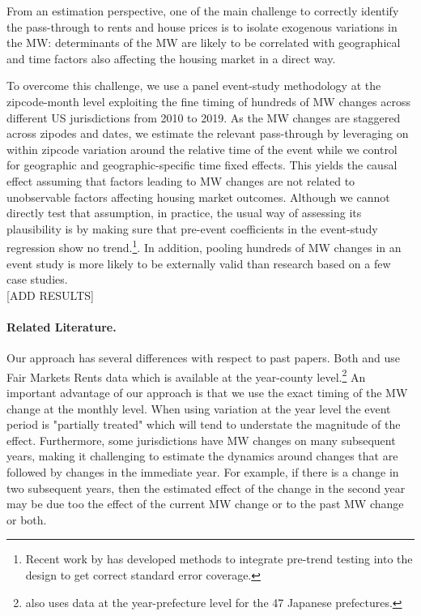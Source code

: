 From an estimation perspective, one of the main challenge to correctly identify the pass-through to rents and house prices is to isolate exogenous variations in the MW: determinants of the MW are likely to be correlated with geographical and time factors also affecting the housing market in a direct way. 
 
To overcome this challenge, we use a panel event-study methodology \parencite{abraham2018estimating, borusyak2017revisiting} at the zipcode-month level exploiting the fine timing of hundreds of MW changes across different US jurisdictions from 2010 to 2019. As the MW changes are staggered across zipodes and dates, we estimate the relevant pass-through by leveraging on within zipcode variation around the relative time of the event while we control for geographic and geographic-specific time fixed effects. This yields the causal effect assuming that factors leading to MW changes are not related to unobservable factors affecting housing market outcomes. Although we cannot directly test that assumption, in practice, the usual way of assessing its plausibility is by making sure that pre-event coefficients in the event-study regression show no trend.\footnote{Recent work by \textcite{roth2018pre} has developed methods to integrate pre-trend testing into the design to get correct standard error coverage.}. In addition, pooling hundreds of MW changes in an event study is more likely to be externally valid than research based on a few case studies. \\

[ADD RESULTS] \\

\paragraph{Related Literature.}
Our approach has several differences with respect to past papers. Both \textcite{tidemann2018mw} and \textcite{yamagishi2019minimum} use Fair Markets Rents data which is available at the year-county level.\footnote{\textcite{yamagishi2019minimum} also uses data at the year-prefecture level for the 47 Japanese prefectures.} An important advantage of our approach is that we use the exact timing of the MW change at the monthly level. When using variation at the year level the event period is "partially treated" which will tend to understate the magnitude of the effect. Furthermore, some jurisdictions have MW changes on many subsequent years, making it challenging to estimate the dynamics around changes that are followed by changes in the immediate year. For example, if there is a change in two subsequent years, then the estimated effect of the change in the second year may be due too the effect of the current MW change or to the past MW change or both.

